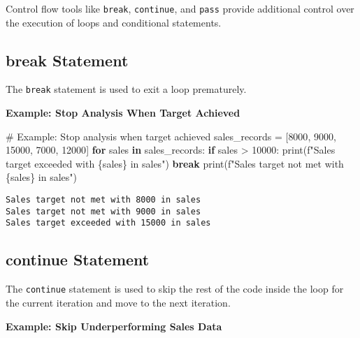 \documentclass[
  letterpaper,
  DIV=11,
  numbers=noendperiod]{scrreprt}
\newenvironment{Shaded}{\begin{snugshade}}{\end{snugshade}}
\newcommand{\BuiltInTok}[1]{\textcolor[rgb]{0.00,0.23,0.31}{#1}}
\newcommand{\CommentTok}[1]{\textcolor[rgb]{0.37,0.37,0.37}{#1}}
\newcommand{\ControlFlowTok}[1]{\textcolor[rgb]{0.00,0.23,0.31}{\textbf{#1}}}
\newcommand{\DecValTok}[1]{\textcolor[rgb]{0.68,0.00,0.00}{#1}}
\newcommand{\KeywordTok}[1]{\textcolor[rgb]{0.00,0.23,0.31}{\textbf{#1}}}
\newcommand{\NormalTok}[1]{\textcolor[rgb]{0.00,0.23,0.31}{#1}}
\newcommand{\OperatorTok}[1]{\textcolor[rgb]{0.37,0.37,0.37}{#1}}
\newcommand{\SpecialCharTok}[1]{\textcolor[rgb]{0.37,0.37,0.37}{#1}}
\newcommand{\SpecialStringTok}[1]{\textcolor[rgb]{0.13,0.47,0.30}{#1}}
\begin{document}
Control flow tools like \texttt{break}, \texttt{continue}, and
\texttt{pass} provide additional control over the execution of loops and
conditional statements.

\subsection{break Statement}\label{break-statement}

The \texttt{break} statement is used to exit a loop prematurely.

\textbf{Example: Stop Analysis When Target Achieved}

\begin{Shaded}
\begin{Highlighting}[]
\CommentTok{\# Example: Stop analysis when target achieved}
\NormalTok{sales\_records }\OperatorTok{=}\NormalTok{ [}\DecValTok{8000}\NormalTok{, }\DecValTok{9000}\NormalTok{, }\DecValTok{15000}\NormalTok{, }\DecValTok{7000}\NormalTok{, }\DecValTok{12000}\NormalTok{]}
\ControlFlowTok{for}\NormalTok{ sales }\KeywordTok{in}\NormalTok{ sales\_records:}
    \ControlFlowTok{if}\NormalTok{ sales }\OperatorTok{\textgreater{}} \DecValTok{10000}\NormalTok{:}
        \BuiltInTok{print}\NormalTok{(}\SpecialStringTok{f"Sales target exceeded with }\SpecialCharTok{\{}\NormalTok{sales}\SpecialCharTok{\}}\SpecialStringTok{ in sales"}\NormalTok{)}
        \ControlFlowTok{break}
    \BuiltInTok{print}\NormalTok{(}\SpecialStringTok{f"Sales target not met with }\SpecialCharTok{\{}\NormalTok{sales}\SpecialCharTok{\}}\SpecialStringTok{ in sales"}\NormalTok{)}
\end{Highlighting}
\end{Shaded}

\begin{verbatim}
Sales target not met with 8000 in sales
Sales target not met with 9000 in sales
Sales target exceeded with 15000 in sales
\end{verbatim}

\subsection{continue Statement}\label{continue-statement}

The \texttt{continue} statement is used to skip the rest of the code
inside the loop for the current iteration and move to the next
iteration.

\textbf{Example: Skip Underperforming Sales Data}
\end{document}
